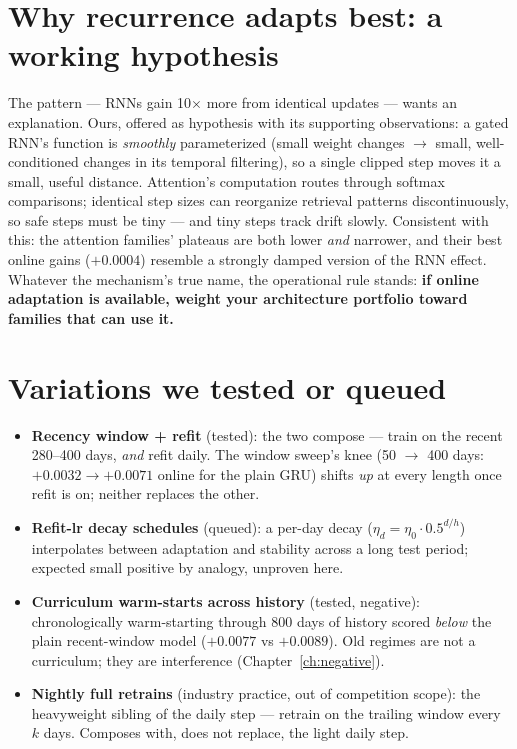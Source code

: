 \section{Why recurrence adapts best: a working hypothesis}

The pattern --- RNNs gain 10$\times$ more from identical updates --- wants
an explanation. Ours, offered as hypothesis with its supporting
observations: a gated RNN's function is \emph{smoothly} parameterized
(small weight changes $\to$ small, well-conditioned changes in its
temporal filtering), so a single clipped step moves it a small, useful
distance. Attention's computation routes through softmax comparisons;
identical step sizes can reorganize retrieval patterns discontinuously,
so safe steps must be tiny --- and tiny steps track drift slowly.
Consistent with this: the attention families' plateaus are both lower
\emph{and} narrower, and their best online gains ($+0.0004$) resemble a
strongly damped version of the RNN effect. Whatever the mechanism's true
name, the operational rule stands: \textbf{if online adaptation is
available, weight your architecture portfolio toward families that can
use it.}

\section{Variations we tested or queued}

\begin{itemize}
\item \textbf{Recency window + refit} (tested): the two compose --- train
  on the recent 280--400 days, \emph{and} refit daily. The window sweep's
  knee (50 $\to$ 400 days: $+0.0032 \to +0.0071$ online for the plain GRU)
  shifts \emph{up} at every length once refit is on; neither replaces the
  other.
\item \textbf{Refit-lr decay schedules} (queued): a per-day decay
  ($\eta_d = \eta_0 \cdot 0.5^{d/h}$) interpolates between adaptation and
  stability across a long test period; expected small positive by
  analogy, unproven here.
\item \textbf{Curriculum warm-starts across history} (tested, negative):
  chronologically warm-starting through 800 days of history scored
  \emph{below} the plain recent-window model ($+0.0077$ vs $+0.0089$).
  Old regimes are not a curriculum; they are interference
  (Chapter~\ref{ch:negative}).
\item \textbf{Nightly full retrains} (industry practice, out of
  competition scope): the heavyweight sibling of the daily step ---
  retrain on the trailing window every $k$ days. Composes with, does not
  replace, the light daily step.
\end{itemize}

